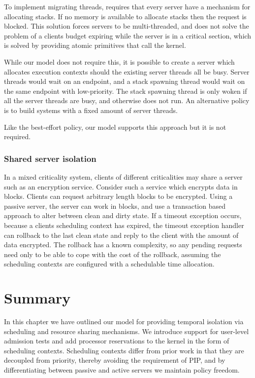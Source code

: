 To implement migrating threads, \composite requires that every server have a mechanism for allocating stacks.
If no memory is available to allocate stacks then the request is blocked.
This solution forces servers to be multi-threaded, and does not solve the problem of a clients budget expiring while the server is in a critical section, which is solved by providing atomic primitives that call the kernel.

While our model does not require this, it is possible to create a server which allocates execution
contexts should the existing server threads all be busy. Server threads would wait on an endpoint,
and a stack spawning thread would wait on the same endpoint with low-priority. The stack spawning
thread is only woken if all the server threads are busy, and otherwise does not run. An
alternative policy is to build systems with a fixed amount of server threads. 

Like the best-effort policy, our model supports this approach but it is not required.

\subsubsection{Shared server isolation}

In a mixed criticality system, clients of different criticalities may share a server such as an
encryption service. Consider such a service which encrypts data in blocks. Clients can request
arbitrary length blocks to be encrypted. Using a passive server, the server can work in blocks, and
use a transaction based approach to alter between clean and dirty state. If a timeout exception
occurs, because a clients scheduling context has expired, the timeout exception handler can rollback
to the last clean state and reply to the client with the amount of data encrypted. The rollback has
a known complexity, so any pending requests need only to be able to cope with the cost of the
rollback, assuming the scheduling contexts are configured with a schedulable time allocation.

\section{Summary}

In this chapter we have outlined our model for providing temporal isolation via scheduling and
resource sharing mechanisms. We introduce support for user-level
admission tests and add processor reservations to the kernel in the form of scheduling contexts.  
Scheduling contexts differ from prior work in that they are decoupled from priority, thereby
avoiding the requirement of \gls{PIP}, and by differentiating between passive and active servers we
maintain policy freedom.

